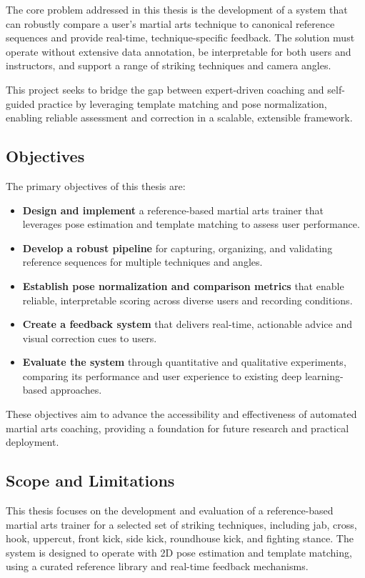 \documentclass[12pt]{article}
\begin{document}
{The core problem addressed in this thesis is the development of a system that can robustly compare a user's martial arts technique to canonical reference sequences and provide real-time, technique-specific feedback. The solution must operate without extensive data annotation, be interpretable for both users and instructors, and support a range of striking techniques and camera angles.

This project seeks to bridge the gap between expert-driven coaching and self-guided practice by leveraging template matching and pose normalization, enabling reliable assessment and correction in a scalable, extensible framework.

 

\subsection{Objectives}
The primary objectives of this thesis are:

\begin{itemize}
\item \textbf{Design and implement} a reference-based martial arts trainer that leverages pose estimation and template matching to assess user performance.
\item \textbf{Develop a robust pipeline} for capturing, organizing, and validating reference sequences for multiple techniques and angles.
\item \textbf{Establish pose normalization and comparison metrics} that enable reliable, interpretable scoring across diverse users and recording conditions.
\item \textbf{Create a feedback system} that delivers real-time, actionable advice and visual correction cues to users.
\item \textbf{Evaluate the system} through quantitative and qualitative experiments, comparing its performance and user experience to existing deep learning-based approaches.
\end{itemize}

These objectives aim to advance the accessibility and effectiveness of automated martial arts coaching, providing a foundation for future research and practical deployment.

\subsection{Scope and Limitations}
This thesis focuses on the development and evaluation of a reference-based martial arts trainer for a selected set of striking techniques, including jab, cross, hook, uppercut, front kick, side kick, roundhouse kick, and fighting stance. The system is designed to operate with 2D pose estimation and template matching, using a curated reference library and real-time feedback mechanisms.

}
\end{document}
